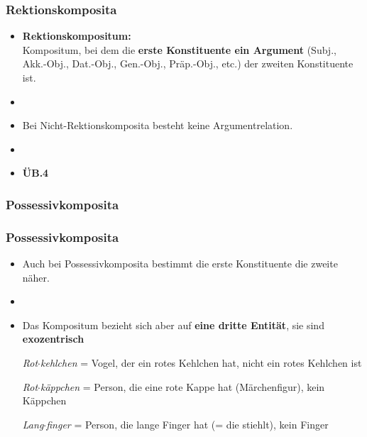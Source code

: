 \begin{frame}
\frametitle{Rektionskomposita}

\begin{itemize}
	\item \textbf{Rektionskompositum:} \\
	Kompositum, bei dem die \textbf{erste Konstituente ein Argument} (Subj., Akk.-Obj., Dat.-Obj., Gen.-Obj., Präp.-Obj., etc.) der zweiten Konstituente ist.
	\item[]
	\item Bei Nicht-Rektionskomposita besteht keine Argumentrelation.
	\item[]
	\item[] \textbf{ÜB.4}
	
\end{itemize}


\end{frame}


\subsubsection{Possessivkomposita}


\begin{frame}
\frametitle{Possessivkomposita}

\begin{itemize}
	\item Auch bei Possessivkomposita bestimmt die erste Konstituente die zweite näher.
	\item[]
	\item Das Kompositum bezieht sich aber auf \textbf{eine dritte Entität}, sie sind \textbf{exozentrisch}
	
	\ea \emph{Rot$\cdot$kehlchen} = Vogel, der ein rotes Kehlchen hat, nicht ein rotes Kehlchen ist
	\z
	
	\ea \emph{Rot$\cdot$käppchen} = Person, die eine rote Kappe hat (Märchenfigur), kein Käppchen
	\z
	
	\ea \emph{Lang$\cdot$finger} = Person, die lange Finger hat (= die stiehlt), kein Finger
	\z
	
\end{itemize}


\end{frame}


